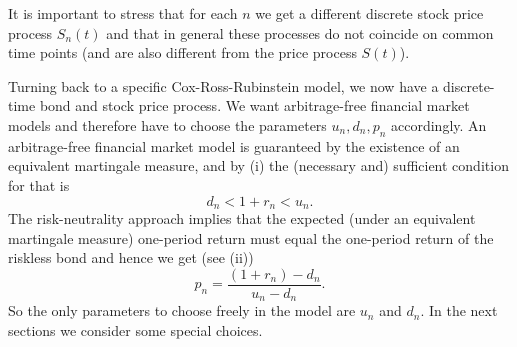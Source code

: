 It is important to stress that for each \(n\) we get a different discrete stock price process \(S_n(t)\) and that in general these processes do not coincide on common time points (and are also different from the price process \(S(t)\)).

Turning back to a specific Cox-Ross-Rubinstein model, we now have a discrete-time bond and stock price process. We want arbitrage-free financial market models and therefore have to choose the parameters \(u_n, d_n, p_n\) accordingly. An arbitrage-free financial market model is guaranteed by the existence of an equivalent martingale measure, and by (i) the (necessary and) sufficient condition for that is
\[
	d_n < 1 + r_n < u_n.
\]
The risk-neutrality approach implies that the expected (under an equivalent martingale measure) one-period return must equal the one-period return of the riskless bond and hence we get (see (ii))
\begin{equation} \label{eq:RiskNeutralProb}
	p_n = \frac{(1+r_n) - d_n}{u_n - d_n}.
\end{equation}
So the only parameters to choose freely in the model are \(u_n\) and \(d_n\). In the next sections we consider some special choices.

